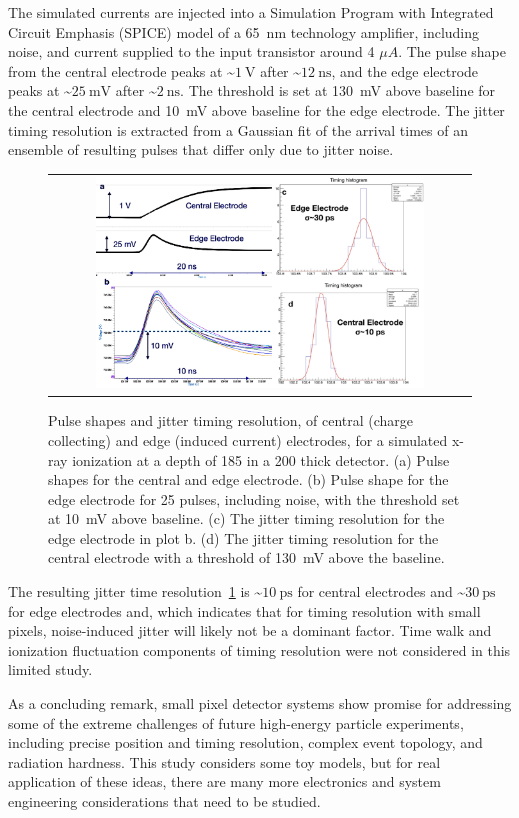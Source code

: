 The simulated currents are injected into a Simulation Program with Integrated Circuit Emphasis (SPICE) model of a \SI{65}{\nm} technology amplifier, including noise, and current supplied to the input transistor around 4 $\mu A$.
The pulse shape from the central electrode peaks at \sim$\SI{1}{\V}$ after \sim$\SI{12}{\ns}$, and the edge electrode peaks at \sim$\SI{25}{\mV}$ after \sim$\SI{2}{\ns}$.
The threshold is set at \SI{130}{\mV} above baseline for the central electrode and \SI{10}{\mV} above baseline for the edge electrode.
The jitter timing resolution is extracted from a Gaussian fit of the arrival times of an ensemble of resulting pulses that differ only due to jitter noise.
\begin{figure}[!htb]
  \begin{center}
    \begin{tabular}{c}
      \includegraphics[width=0.80\textwidth]{fig_FastTiming/TimingResolutions.png}
    \end{tabular}
    \caption{Pulse shapes and jitter timing resolution, of central (charge collecting) and edge (induced current) electrodes, for a simulated x-ray ionization at a depth of \SI{185}{\micron} in a \SI{200}{\micron} thick detector.
        (a) Pulse shapes for the central and edge electrode. 
        (b) Pulse shape for the edge electrode for 25 pulses, including noise, with the threshold set at \SI{10}{\mV} above baseline.
        (c) The jitter timing resolution for the edge electrode in plot b.
        (d) The jitter timing resolution for the central electrode with a threshold of \SI{130}{\mV} above the baseline.
            }
    \label{TimingResolutions}
  \end{center}
\end{figure}

The resulting jitter time resolution~\ref{TimingResolutions} is \sim$\SI{10}{\ps}$ for central electrodes and \sim$\SI{30}{\ps}$ for edge electrodes and, which indicates that for timing resolution with small pixels, noise-induced jitter will likely not be a dominant factor.
Time walk and ionization fluctuation components of timing resolution were not considered in this limited study.

As a concluding remark, small pixel detector systems show promise for addressing some of the extreme challenges of future high-energy particle experiments, including precise position and timing resolution, complex event topology, and radiation hardness.
This study considers some toy models, but for real application of these ideas, there are many more electronics and system engineering considerations that need to be studied.